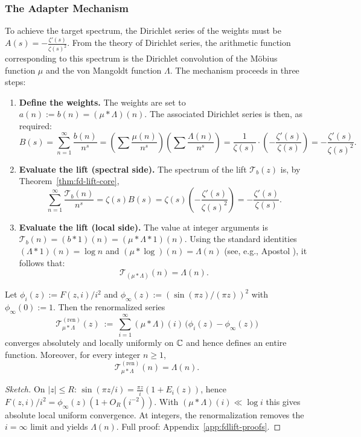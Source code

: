\subsubsection{The Adapter Mechanism}
To achieve the target spectrum, the Dirichlet series of the weights must be $A(s) = -\frac{\zeta'(s)}{\zeta(s)^2}$. From the theory of Dirichlet series, the arithmetic function corresponding to this spectrum is the Dirichlet convolution of the M\"obius function $\mu$ and the von Mangoldt function $\Lambda$. The mechanism proceeds in three steps:
\begin{enumerate}
    \item \textbf{Define the weights.} The weights are set to $a(n) := b(n) = (\mu * \Lambda)(n)$. The associated Dirichlet series is then, as required:
    \[
    B(s) = \sum_{n=1}^{\infty}\frac{b(n)}{n^s} = \left(\sum\frac{\mu(n)}{n^s}\right)\left(\sum\frac{\Lambda(n)}{n^s}\right) = \frac{1}{\zeta(s)}\cdot\left(-\frac{\zeta'(s)}{\zeta(s)}\right) = -\frac{\zeta'(s)}{\zeta(s)^2}.
    \]
    \item \textbf{Evaluate the lift (spectral side).} The spectrum of the lift $\mathcal{T}_b(z)$ is, by Theorem~\ref{thm:fd-lift-core},
    \[
    \sum_{n=1}^{\infty}\frac{\mathcal T_b(n)}{n^s} = \zeta(s)B(s) = \zeta(s) \left(-\frac{\zeta'(s)}{\zeta(s)^2}\right) = -\frac{\zeta'(s)}{\zeta(s)}.
    \]
    \item \textbf{Evaluate the lift (local side).} The value at integer arguments is $\mathcal{T}_b(n)=(b*1)(n) = (\mu * \Lambda * 1)(n)$. Using the standard identities $(\Lambda*1)(n)=\log n$ and $(\mu*\log)(n)=\Lambda(n)$ (see, e.g., Apostol \cite[Ch.~2]{apostol1976}), it follows that:
    \[
    \mathcal{T}_{(\mu*\Lambda)}(n) = \Lambda(n).
    \]
\end{enumerate}

\begin{theorem}[Renormalized FD-lift for $a=\mu*\Lambda$]\label{thm:renormalized-muLambda}
Let $\phi_i(z):=F(z,i)/i^2$ and $\phi_\infty(z):=(\sin(\pi z)/(\pi z))^2$ with $\phi_\infty(0):=1$. Then the renormalized series
\[
\mathcal{T}^{(\mathrm{ren})}_{\mu*\Lambda}(z)\ :=\ \sum_{i=1}^{\infty}(\mu*\Lambda)(i)\,\bigl(\phi_i(z)-\phi_\infty(z)\bigr)
\]
converges absolutely and locally uniformly on $\mathbb{C}$ and hence defines an entire function. Moreover, for every integer $n\ge1$,
\[
\mathcal{T}^{(\mathrm{ren})}_{\mu*\Lambda}(n)=\Lambda(n).
\]
\end{theorem}
\begin{proof}[Sketch]
On $|z|\le R$: $\sin(\pi z/i)=\frac{\pi z}{i}(1+E_i(z))$, hence $F(z,i)/i^2=\phi_\infty(z)(1+O_R(i^{-2}))$.
With $(\mu*\Lambda)(i)\ll\log i$ this gives absolute local uniform convergence.
At integers, the renormalization removes the $i=\infty$ limit and yields $\Lambda(n)$.
Full proof: Appendix~\ref{app:fdlift-proofs}.
\end{proof}


